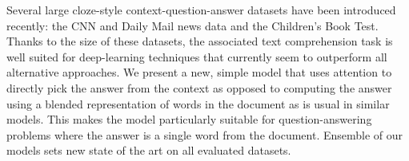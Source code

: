 Several large cloze-style context-question-answer datasets have been introduced recently: the CNN and Daily Mail news data and the Children's Book Test. Thanks to the size of these datasets, the associated text comprehension task is well suited for deep-learning techniques that currently seem to outperform all alternative approaches. We present a new, simple model that uses attention to directly pick the answer from the context as opposed to computing the answer using a blended representation of words in the document as is usual in similar models. This makes the model particularly suitable for question-answering problems where the answer is a single word from the document. Ensemble of our models sets new state of the art on all evaluated datasets.
